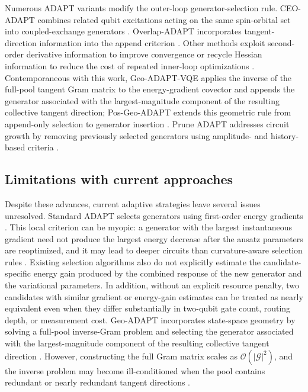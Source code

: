 \documentclass[
  reprint,
  amsmath,
  amssymb,
  aps,
  pra,
  nofootinbib,
  superscriptaddress,
  floatfix
]{revtex4-2}
\begin{document}
Numerous ADAPT variants modify the outer-loop generator-selection rule. CEO-ADAPT combines related qubit excitations acting on the same spin-orbital set into coupled-exchange generators \cite{Ramoa2025}. Overlap-ADAPT incorporates tangent-direction information into the append criterion \cite{Feniou2023}. Other methods exploit second-order derivative information to improve convergence \cite{Grimsley2023ADAPT} or recycle Hessian information to reduce the cost of repeated inner-loop optimizations \cite{Ramoa2025HessianRecycling}. Contemporaneous with this work, Geo-ADAPT-VQE applies the inverse of the full-pool tangent Gram matrix to the energy-gradient covector and appends the generator associated with the largest-magnitude component of the resulting collective tangent direction; Pos-Geo-ADAPT extends this geometric rule from append-only selection to generator insertion \cite{Sohail2026GeoADAPT}. Prune ADAPT addresses circuit growth by removing previously selected generators using amplitude- and history-based criteria \cite{Vaquero2025PrunedADAPT}.

\subsection{Limitations with current approaches}
Despite these advances, current adaptive strategies leave several issues unresolved. Standard ADAPT selects generators using first-order energy gradients \cite{Grimsley2019,Tang2021,Yordanov2021}. This local criterion can be myopic: a generator with the largest instantaneous gradient need not produce the largest energy decrease after the ansatz parameters are reoptimized, and it may lead to deeper circuits than curvature-aware selection rules \cite{Feniou2023,Grimsley2023ADAPT}. Existing selection algorithms also do not explicitly estimate the candidate-specific energy gain produced by the combined response of the new generator and the variational parameters. In addition, without an explicit resource penalty, two candidates with similar gradient or energy-gain estimates can be treated as nearly equivalent even when they differ substantially in two-qubit gate count, routing depth, or measurement cost.
Geo-ADAPT incorporates state-space geometry by solving a full-pool inverse-Gram problem and selecting the generator associated with the largest-magnitude component of the resulting collective tangent direction \cite{Sohail2026GeoADAPT}. However, constructing the full Gram matrix scales as $\mathcal{O}(|\mathcal{G}|^2)$, and the inverse problem may become ill-conditioned when the pool contains redundant or nearly redundant tangent directions \cite{Sohail2026GeoADAPT,Ramoa2025HessianRecycling,Ikhtiarudin2025ShotEfficient}.
\end{document}
